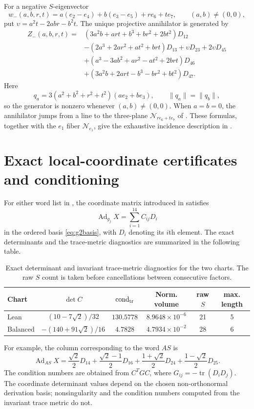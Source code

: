 \documentclass[11pt,a4paper]{article}
\newcommand{\Ad}{\operatorname{Ad}}
\begin{document}
For a negative $S$-eigenvector
\[
w_-(a,b,r,t)=a(e_2-e_4)+b(e_3-e_5)+re_6+te_7,
\qquad (a,b)\ne(0,0),
\]
put $\upsilon=a^2t-2abr-b^2t$.  The unique projective annihilator is generated by
\begin{align*}
Z_-(a,b,r,t)={}&(3a^2b+art+b^3+br^2+2bt^2)D_{12}\\
&-(2a^3+2ar^2+at^2+brt)D_{13}+\upsilon D_{23}+2\upsilon D_{45}\\
&+(a^3-3ab^2+ar^2-at^2+2brt)D_{46}\\
&+(3a^2b+2art-b^3-br^2+bt^2)D_{47}.
\end{align*}
Here
\[
q_a=3(a^2+b^2+r^2+t^2)(ae_2+be_3),
\qquad \lVert q_a\rVert=\lVert q_b\rVert,
\]
so the generator is nonzero whenever $(a,b)\ne(0,0)$.  When $a=b=0$, the annihilator jumps from a line to the three-plane $\mathcal N_{re_6+te_7}$ of .  These formulas, together with the $e_1$ fiber $\mathcal N_{e_1}$, give the exhaustive incidence description in .

\section{Exact local-coordinate certificates and conditioning}
\label{app:chartcertificates}
For either word list in , the coordinate matrix introduced in  satisfies
\[
\Ad_{g_j}X=\sum_{i=1}^{14}C_{ij}D_i
\]
in the ordered basis \eqref{eq:g2basis}, with $D_i$ denoting its $i$th element.  The exact determinants and the trace-metric diagnostics are summarized in the following table.

\begin{table}[ht]
\centering\small
\begin{tabular}{@{}lccccc@{}}
\toprule
Chart & $\det C$ & $\operatorname{cond}_{\rm tr}$ & Norm. volume & raw $S$ & max. length\\
\midrule
Lean & $(10-7\sqrt2)/32$ & $130.5778$ & $8.9648\times10^{-6}$ & 21 & 5\\
Balanced & $-(140+91\sqrt2)/16$ & $4.7828$ & $4.7934\times10^{-2}$ & 28 & 6\\
\bottomrule
\end{tabular}
\caption{Exact determinant and invariant trace-metric diagnostics for the two charts.  The raw $S$ count is taken before cancellations between consecutive factors.}
\end{table}

For example, the column corresponding to the word $AS$ is
\[
\Ad_{AS}X=\frac{\sqrt2}{2}D_{14}+\frac{\sqrt2-1}{2}D_{16}+\frac{1+\sqrt2}{2}D_{24}+\frac{1-\sqrt2}{2}D_{25}.
\]
The condition numbers are obtained from $C^TGC$, where $G_{ij}=-\operatorname{tr}(D_iD_j)$.  The coordinate determinant values depend on the chosen non-orthonormal derivation basis; nonsingularity and the condition numbers computed from the invariant trace metric do not.
\end{document}
